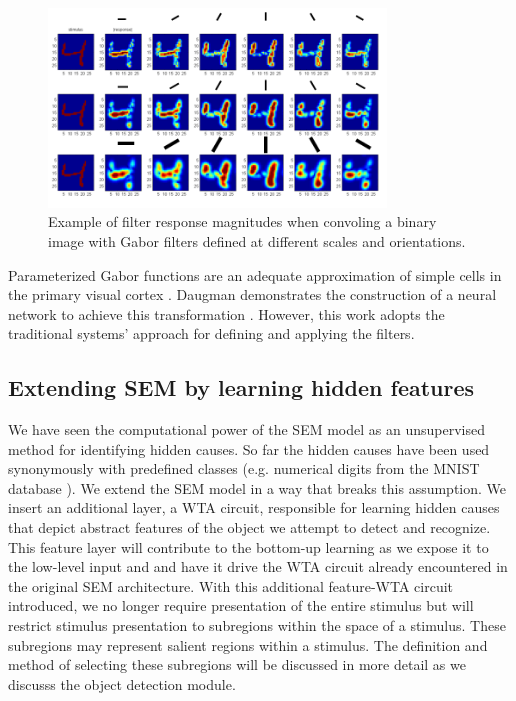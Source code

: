 \documentclass{report}
\begin{document}
\begin{figure}[ht]
\centering
\includegraphics[width=0.8\textwidth]{response4}
\caption{Example of filter response magnitudes when convoling a binary image with Gabor filters defined at different scales and orientations.
\label{fig:response4}}
\end{figure}

Parameterized Gabor functions are an adequate approximation of simple cells in the primary visual cortex \cite{Serre2004}. Daugman demonstrates the construction of a neural network to achieve this transformation \cite{Daugman1988}. However, this work adopts the traditional systems' approach for defining and applying the filters.

\subsection{Extending SEM by learning hidden features}

We have seen the computational power of the SEM model as an unsupervised method for identifying hidden causes. So far the hidden causes have been used synonymously with predefined classes (e.g. numerical digits from the MNIST database \cite{LeCun1998}). We extend the SEM model in a way that breaks this assumption. We insert an additional layer, a WTA circuit, responsible for learning hidden causes that depict abstract features of the object we attempt to detect and recognize. This feature layer will contribute to the bottom-up learning as we expose it to the low-level input and and have it drive the WTA circuit already encountered in the original SEM architecture. With this additional feature-WTA circuit introduced, we no longer require presentation of the entire stimulus but will restrict stimulus presentation to subregions within the space of a stimulus. These subregions may represent salient regions within a stimulus. The definition and method of selecting these subregions will be discussed in more detail as we discusss the object detection module.
\end{document}
